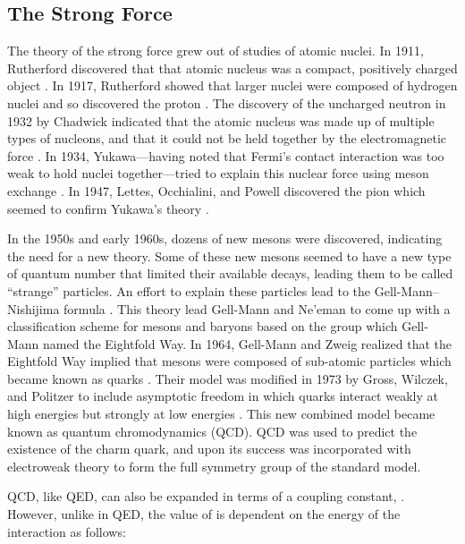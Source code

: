 \subsection{The Strong Force}
\label{ssec:strong_force}

The theory of the strong force grew out of studies of atomic nuclei. In 1911,
Rutherford discovered that that atomic nucleus was a compact, positively
charged object \cite{rutherford1911}. In 1917, Rutherford showed that larger
nuclei were composed of hydrogen nuclei and so discovered the proton
\cite{rutherford1919}. The discovery of the uncharged neutron in 1932 by
Chadwick indicated that the atomic nucleus was made up of multiple types of
nucleons, and that it could not be held together by the electromagnetic force
\cite{chadwick1932}. In 1934, Yukawa---having noted that Fermi's contact
interaction was too weak to hold nuclei together---tried to explain this
nuclear force using meson exchange \cite{yukawa1935}. In 1947, Lettes,
Occhialini, and Powell discovered the pion which seemed to confirm Yukawa's
theory \cite{lattes1947}.

In the 1950s and early 1960s, dozens of new mesons were discovered, indicating
the need for a new theory. Some of these new mesons seemed to have a new type
of quantum number that limited their available decays, leading them to be
called ``strange'' particles. An effort to explain these particles lead to the
Gell-Mann--Nishijima formula
\cite{nakano1953}\cite{nishijima1955}\cite{gellmann1956}. This theory lead
Gell-Mann and Ne'eman to come up with a classification scheme for mesons and
baryons based on the \SUthree group which Gell-Mann named the Eightfold Way. In
1964, Gell-Mann and Zweig realized that the Eightfold Way implied that mesons
were composed of sub-atomic particles which became known as quarks
\cite{gellmann1964}\cite{zweig1964}. Their model was modified in 1973 by Gross,
Wilczek, and Politzer to include asymptotic freedom in which quarks interact
weakly at high energies but strongly at low energies
\cite{gross_1973}\cite{politzer_1973}. This new combined model became known as
quantum chromodynamics (QCD). QCD was used to predict the existence of the
charm quark, and upon its success was incorporated with electroweak theory to
form the full \SUthreeSUtwoUone symmetry group of the standard model.

QCD, like QED, can also be expanded in terms of a coupling constant,
\alphastrong. However, unlike \fsc in QED, the value of \alphastrong is
dependent on the energy of the interaction as follows:

